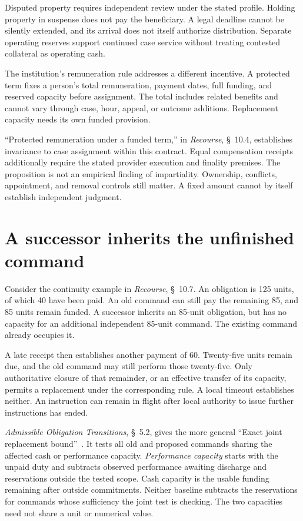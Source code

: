\documentclass{momentum}
\begin{document}
Disputed property requires independent review under the stated profile. Holding property in suspense does not pay the beneficiary. A legal deadline cannot be silently extended, and its arrival does not itself authorize distribution. Separate operating reserves support continued case service without treating contested collateral as operating cash.

The institution's remuneration rule addresses a different incentive. A protected term fixes a person's total remuneration, payment dates, full funding, and reserved capacity before assignment. The total includes related benefits and cannot vary through case, hour, appeal, or outcome additions. Replacement capacity needs its own funded provision.

``Protected remuneration under a funded term,'' in \emph{Recourse}, \S~10.4, establishes invariance to case assignment within this contract. Equal compensation receipts additionally require the stated provider execution and finality premises. The proposition is not an empirical finding of impartiality. Ownership, conflicts, appointment, and removal controls still matter. A fixed amount cannot by itself establish independent judgment.

\section{A successor inherits the unfinished command}

Consider the continuity example in \emph{Recourse}, \S~10.7. An obligation is 125 units, of which 40 have been paid. An old command can still pay the remaining 85, and 85 units remain funded. A successor inherits an 85-unit obligation, but has no capacity for an additional independent 85-unit command. The existing command already occupies it.

A late receipt then establishes another payment of 60. Twenty-five units remain due, and the old command may still perform those twenty-five. Only authoritative closure of that remainder, or an effective transfer of its capacity, permits a replacement under the corresponding rule. A local timeout establishes neither. An instruction can remain in flight after local authority to issue further instructions has ended.

\emph{Admissible Obligation Transitions}, \S~5.2, gives the more general ``Exact joint replacement bound''~\cite{obligation-transitions}. It tests all old and proposed commands sharing the affected cash or performance capacity. \emph{Performance capacity} starts with the unpaid duty and subtracts observed performance awaiting discharge and reservations outside the tested scope. Cash capacity is the usable funding remaining after outside commitments. Neither baseline subtracts the reservations for commands whose sufficiency the joint test is checking. The two capacities need not share a unit or numerical value.
\end{document}
